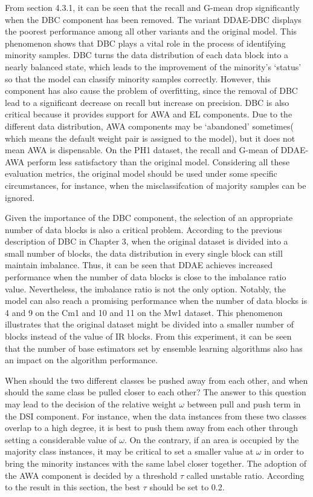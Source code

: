 From section 4.3.1, it can be seen that the recall and G-mean drop significantly when the DBC component has been removed. The variant DDAE-DBC displays the poorest performance among all other variants and the original model. This phenomenon shows that DBC plays a vital role in the process of identifying minority samples. DBC turns the data distribution of each data block into a nearly balanced state, which leads to the improvement of the minority’s ‘status’ so that the model can classify minority samples correctly. However, this component has also cause the problem of overfitting, since the removal of DBC lead to a significant decrease on recall but increase on precision. DBC is also critical because it provides support for AWA and EL components. Due to the different data distribution, AWA components may be ‘abandoned’ sometimes( which means the default weight pair is assigned to the model), but it does not mean AWA is dispensable. On the PH1 dataset, the recall and G-mean of DDAE-AWA perform less satisfactory than the original model. Considering all these evaluation metrics, the original model should be used under some specific circumstances, for instance, when the misclassifcation of majority samples can be ignored.

Given the importance of the DBC component, the selection of an appropriate number of data blocks is also a critical problem. According to the previous description of DBC in Chapter 3, when the original dataset is divided into a small number of blocks, the data distribution in every single block can still maintain imbalance. Thus, it can be seen that DDAE achieves increased performance when the number of data blocks is close to the imbalance ratio value. Nevertheless, the imbalance ratio is not the only option. Notably, the model can also reach a promising performance when the number of data blocks is 4 and 9 on the Cm1 and 10 and 11 on the Mw1 dataset. This phenomenon illustrates that the original dataset might be divided into a smaller number of blocks instead of the value of IR blocks. From this experiment, it can be seen that the number of base estimators set by ensemble learning algorithms also has an impact on the algorithm performance.

When should the two different classes be pushed away from each other, and when should the same class be pulled closer to each other? The answer to this question may lead to the decision of the relative weight $\omega$ between pull and push term in the DSI component. For instance, when the data instances from these two classes overlap to a high degree, it is best to push them away from each other through setting a considerable value of $\omega$. On the contrary, if an area is occupied by the majority class instances, it may be critical to set a smaller value at $\omega$ in order to bring the minority instances with the same label closer together. 
The adoption of the AWA component is decided by a threshold $\tau$ called unstable ratio. According to the result in this section, the best $\tau$ should be set to 0.2.


